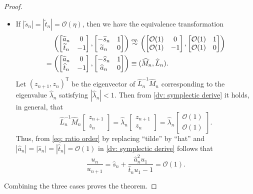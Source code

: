 \documentclass[11pt]{article}
\numberwithin{equation}{section}
\begin{document}
\begin{proof}
\begin{itemize}
\item[(iii)] If $|\widetilde{s}_n| = |\widetilde{t}_n| = \mathcal{O}(\eta)$, then we have the equivalence transformation
\begin{align} \label{dv: symplectic derive}
\left(
\begin{bmatrix}
\widetilde{a}_n & 0 \\
\widetilde{t}_n & -1
\end{bmatrix},
\begin{bmatrix}
-\widetilde{s}_n & 1 \\
\widetilde{a}_n & 0
\end{bmatrix}
\right)
&\overset{eq.}{\sim}
\left(
\begin{bmatrix}
\mathcal{O}(1) & 0 \\
\mathcal{O}(1) & -1
\end{bmatrix},
\begin{bmatrix}
\mathcal{O}(1) & 1 \\
\mathcal{O}(1) & 0
\end{bmatrix}
\right) \notag \\
=
\left(
\begin{bmatrix}
\widehat{a}_n & 0 \\
\widehat{t}_n & -1
\end{bmatrix},
\begin{bmatrix}
-\widehat{s}_n & 1 \\
\widehat{a}_n & 0
\end{bmatrix}
\right)
&\equiv
(\widehat{M}_n,\widehat{L}_n).
\end{align}
Let $(z_{n+1},z_n)^{\mathsf{T}}$ be the eigenvector of $\widehat{L}_n^{-1}\widehat{M}_n$ corresponding to the eigenvalue $\widehat{\lambda}_n$ satisfying $|\widehat{\lambda}_n|<1$. Then from \eqref{dv: symplectic derive} it holds, in general,  that
\begin{equation} \label{dv: iteration derive}
\widehat{L}_n^{-1}\widehat{M}_n
\begin{bmatrix}
z_{n+1} \\
z_n
\end{bmatrix}
=
\widehat{\lambda}_n
\begin{bmatrix}
z_{n+1} \\
z_n
\end{bmatrix} =
\widehat{\lambda}_n
\begin{bmatrix}
\mathcal{O}(1) \\
\mathcal{O}(1)
\end{bmatrix}.
\end{equation}
Thus, from \eqref{eq: ratio order} by replacing “tilde” by “hat” and $|\widehat{a}_n| = |\widehat{s}_n|=|\widehat{t}_n|=\mathcal{O}(1)$ in \eqref{dv: symplectic derive} follows that
\begin{equation} \label{eq: order of ratio result}
\frac{u_n}{u_{n+1}}
=
\widehat{s}_n + \frac{\widehat{a}_n^2 u_1}{\widehat{t}_n u_1 -1}
= \mathcal{O}(1).
\end{equation}
\end{itemize}
Combining the three cases proves the theorem.
\end{proof}
\end{document}
